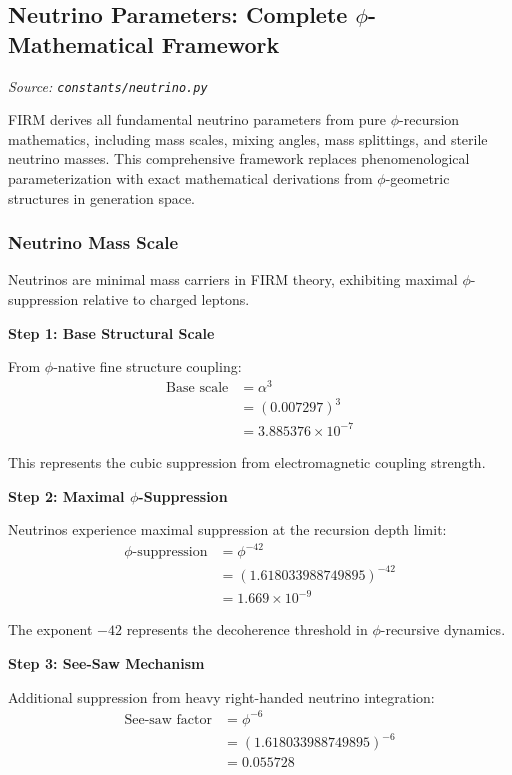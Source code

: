 
\subsection{Neutrino Parameters: Complete $\phi$-Mathematical Framework}
\textit{Source: \texttt{constants/neutrino.py}}

FIRM derives all fundamental neutrino parameters from pure $\phi$-recursion mathematics, including mass scales, mixing angles, mass splittings, and sterile neutrino masses. This comprehensive framework replaces phenomenological parameterization with exact mathematical derivations from $\phi$-geometric structures in generation space.

\subsubsection{Neutrino Mass Scale}

Neutrinos are minimal mass carriers in FIRM theory, exhibiting maximal $\phi$-suppression relative to charged leptons.

\textbf{Step 1: Base Structural Scale}

From $\phi$-native fine structure coupling:
\begin{align}
\text{Base scale} &= \alpha^3 \\
&= (0.007297)^3 \\
&= 3.885376 \times 10^{-7}
\end{align}

This represents the cubic suppression from electromagnetic coupling strength.

\textbf{Step 2: Maximal $\phi$-Suppression}

Neutrinos experience maximal suppression at the recursion depth limit:
\begin{align}
\phi\text{-suppression} &= \phi^{-42} \tag{Recursion depth limit} \\
&= (1.618033988749895)^{-42} \\
&= 1.669 \times 10^{-9}
\end{align}

The exponent $-42$ represents the decoherence threshold in $\phi$-recursive dynamics.

\textbf{Step 3: See-Saw Mechanism}

Additional suppression from heavy right-handed neutrino integration:
\begin{align}
\text{See-saw factor} &= \phi^{-6} \\
&= (1.618033988749895)^{-6} \\
&= 0.055728
\end{align}

